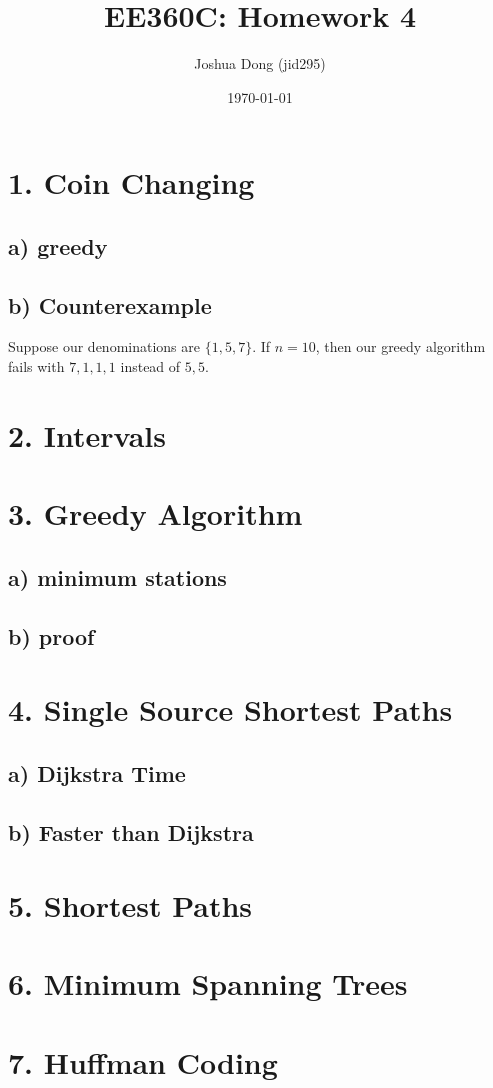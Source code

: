 \documentclass{article}
\begin{document}
\title{EE360C: Homework 4}
\author{Joshua Dong (jid295)}
\date{\today}
\maketitle

\section*{1. Coin Changing}
\subsection*{a) greedy}
\begin{algorithmic}
\end{algorithmic}

\subsection*{b) Counterexample}
Suppose our denominations are $\{1, 5, 7\}$. If $n = 10$, then our greedy
algorithm fails with $7, 1, 1, 1$ instead of $5, 5$.


\section*{2. Intervals}

\section*{3. Greedy Algorithm}
\subsection*{a) minimum stations}
\subsection*{b) proof}

\section*{4. Single Source Shortest Paths}
\subsection*{a) Dijkstra Time}
\subsection*{b) Faster than Dijkstra}

\section*{5. Shortest Paths}

\section*{6. Minimum Spanning Trees}

\section*{7. Huffman Coding}
\end{document}
